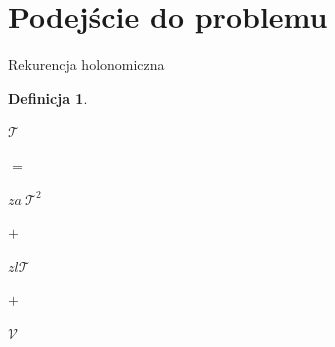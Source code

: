 \documentclass[final]{beamer}
\theoremstyle{bluetheorem}
\theoremstyle{bluetheorem}
\newtheorem{mydefinition}[mytheorem]{Definicja}
\theoremstyle{greentheorem}
\newcommand{\gf}[1]{\ensuremath{\mathcal{#1}}}
\begin{document}
\section{Podejście do problemu}

\begin{frame}{Rekurencja holonomiczna}
    \begin{mydefinition}
        \begin{center}
            \begin{minipage}[t]{.2\textwidth}
                \begin{center}
                    \(\gf{T}\)\\
                \end{center}
            \end{minipage}%
            \begin{minipage}[t]{.05\textwidth}
                \begin{center}
                    \(=\)\\
                \end{center}
            \end{minipage}%
            \begin{minipage}[t]{.2\textwidth}
                \begin{center}
                    \(z a~\gf{T}^2\)\\
                \end{center}
            \end{minipage}%
            \begin{minipage}[t]{.05\textwidth}
                \begin{center}
                    \(+\)\\
                \end{center}
            \end{minipage}%
            \begin{minipage}[t]{.2\textwidth}
                \begin{center}
                    \(z l \gf{T}\)\\
                \end{center}
            \end{minipage}%
            \begin{minipage}[t]{.05\textwidth}
                \begin{center}
                    \(+\)\\
                \end{center}
            \end{minipage}%
            \begin{minipage}[t]{.2\textwidth}
                \begin{center}
                    \(\gf{V}\)\\
                \end{center}
            \end{minipage}%
        \end{center}


\end{mydefinition}
\end{frame}
\end{document}
